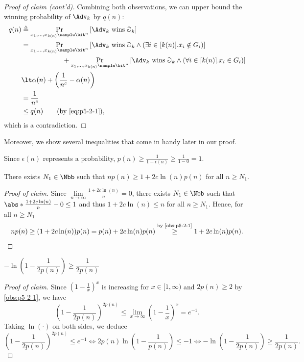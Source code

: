 \begin{answer}[ii]
\begin{proof}[Proof of claim (cont'd)]
        Combining both observations, we can upper bound the winning probability of $\Adv_k$ by $q(n)$:
        \begin{align*}
            q(n)
            &\triangleq \Pr_{x_1,\ldots,x_{k(n)}\sample \bit^{n}}\left[\Adv_{k} \textrm{ wins } \Game_k\right]\\
            &= \Pr_{x_1,\ldots,x_{k(n)}\sample \bit^{n}}\left[\Adv_{k} \textrm{ wins } \Game_k \land (\exists i\in[k(n)]. x_i\notin G_i) \right]\\
            &\qquad\qquad\qquad+ \Pr_{x_1,\ldots,x_{k(n)}\sample \bit^{n}}\left[\Adv_{k} \textrm{ wins } \Game_k \land (\forall i\in[k(n)]. x_i\in G_i) \right]\\
            &\lt \alpha(n)+\left(\frac{1}{n^c}-\alpha(n)\right) \\
            &= \frac{1}{n^c}\\
            &\le q(n) \qquad \textrm{(by \eqref{eq:p5-2-1})},
        \end{align*}
        which is a contradiction.
    \end{proof}

    Moreover, we show several inequalities that come in handy later in our proof.

    \begin{observation}\label{obs:p5-2-1}
        Since $\epsilon(n)$ represents a probability, $p(n)\ge \frac{1}{1-\epsilon(n)}\ge \frac{1}{1-0}=1$.
    \end{observation}
    
    \begin{claim}\label{claim:p5-2-3}
        There exists $N_1\in\Nbb$ such that $np(n)\ge 1+2c\ln(n)p(n)$ for all $n\ge N_1$. 
    \end{claim}
    \begin{proof}[Proof of claim]
        Since $\lim\limits_{n\to\infty} \frac{1+2c\ln(n)}{n}=0$, there exists $N_1\in\Nbb$ such that $\abs*{\frac{1+2c\ln(n)}{n}-0}\le 1$ and thus $1+2c\ln(n)\le n$ for all $n\ge N_1$. 
        Hence, for all $n\ge N_1$
        \[
            np(n)\ge (1+2c\ln(n))p(n)=p(n)+2c\ln(n)p(n)\stackrel{\textrm{by \autoref{obs:p5-2-1}}}{\ge} 1+2c\ln(n)p(n).
        \]
    \end{proof}
    
    \begin{claim}\label{claim:p5-2-4}
        $-\ln\left(1-\dfrac{1}{2p(n)}\right)\ge \dfrac{1}{2p(n)}$
    \end{claim}
    \begin{proof}[Proof of claim]
        Since $\left(1-\frac{1}{x}\right)^x$ is increasing for $x\in [1,\infty)$ and $2p(n)\ge 2$ by \autoref{obs:p5-2-1}, we have 
        \[
            \left(1-\frac{1}{2p(n)}\right)^{2p(n)}
            \le \lim_{x\to\infty}\left(1-\frac{1}{x}\right)^{x}
            =e^{-1}.
        \]
        Taking $\ln(\cdot)$ on both sides, we deduce
        \[
            \left(1-\frac{1}{2p(n)}\right)^{2p(n)}\le e^{-1}
            \iff 2p(n)\ln\left(1-\frac{1}{p(n)}\right)\le -1
            \iff -\ln\left(1-\dfrac{1}{2p(n)}\right)\ge \dfrac{1}{2p(n)}.
        \]
    \end{proof}


\end{answer}

